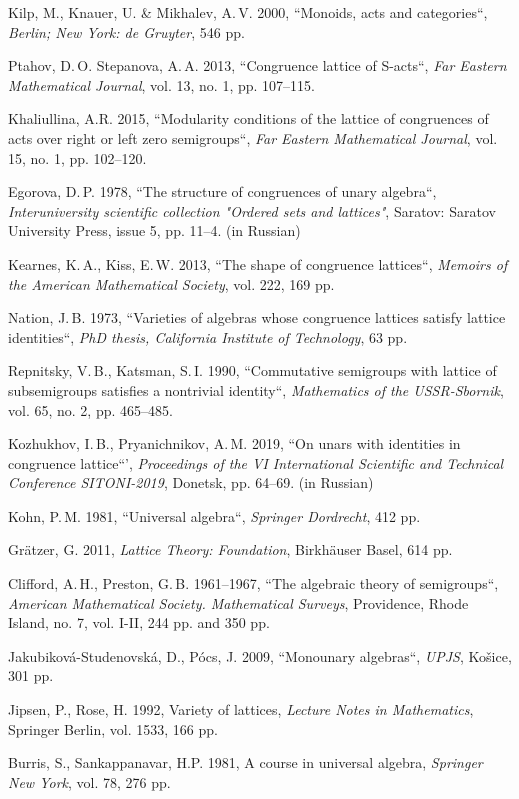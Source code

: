 \documentclass[11pt,twoside,draft
]{article}
\begin{document}
\begin{engbibliography}{99}
	
	Kilp, M., Knauer, U. \& Mikhalev, A.\,V. 2000, ``Monoids, acts and categories``, \textit{Berlin; New York: de Gruyter}, 546 pp.
	
	Ptahov, D.\,O. Stepanova, A.\,A. 2013, ``Congruence lattice of S-acts``, \textit{Far Eastern Mathematical Journal}, vol. 13, no. 1, pp. 107--115.
	
	Khaliullina, A.R. 2015, ``Modularity conditions of the lattice of congruences of acts over right or left zero semigroups``, \textit{Far Eastern Mathematical Journal}, vol. 15, no. 1, pp. 102--120.
	
	Egorova, D.\,P. 1978, ``The structure of congruences of unary algebra``, \textit{Interuniversity scientific collection "Ordered sets and lattices"}, Saratov: Saratov University Press, issue 5, pp. 11--4. (in Russian)
	
	Kearnes, K.\,A., Kiss, E.\,W. 2013, ``The shape of congruence lattices``, \textit{Memoirs of the American Mathematical Society}, vol. 222, 169 pp.
	
	Nation, J.\,B. 1973, ``Varieties of algebras whose congruence lattices satisfy lattice identities``, \textit{PhD thesis, California Institute of Technology}, 63 pp.
	
	Repnitsky, V.\,B., Katsman, S.\,I. 1990, ``Commutative semigroups with lattice of subsemigroups satisfies a nontrivial identity``, \textit{Mathematics of the USSR-Sbornik}, vol. 65, no. 2, pp. 465--485.
	
	Kozhukhov, I.\,B., Pryanichnikov, A.\,M. 2019, ``On unars with identities in congruence lattice``', \textit{Proceedings of the VI International Scientific and Technical Conference SITONI-2019}, Donetsk, pp. 64--69. (in Russian)
	
	Kohn, P.\,M. 1981, ``Universal algebra``, \textit{Springer Dordrecht}, 412 pp.
	
	Grätzer, G. 2011, \textit{Lattice Theory: Foundation}, Birkhäuser Basel, 614 pp.
	
	Clifford, A.\,H., Preston, G.\,B. 1961--1967, ``The algebraic theory of semigroups``, \textit{American Mathematical Society. Mathematical Surveys}, Providence, Rhode Island, no. 7, vol. I-II, 244 pp. and 350 pp.
	
	Jakubiková-Studenovská, D., Pócs, J. 2009, ``Monounary algebras``, \textit{UPJS}, Košice, 301 pp.
	
	Jipsen, P., Rose, H. 1992, Variety of lattices, \textit{Lecture Notes in Mathematics}, Springer Berlin, vol. 1533, 166 pp.
	
	Burris, S., Sankappanavar, H.P. 1981, A course in universal algebra, \textit{Springer New York}, vol. 78, 276 pp.
	
\end{engbibliography}

\label{end}
\end{document}
